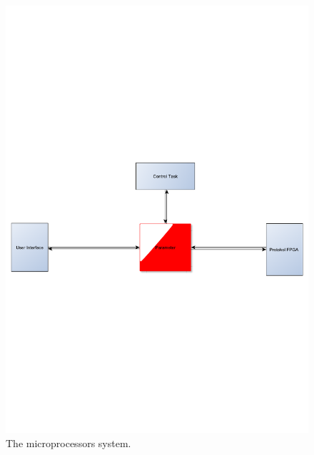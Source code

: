 \begin{figure}[htb]
	\centering
	\includegraphics[scale=0.5,clip,trim=0 300 0 300]{graphics/microprocessor} %
	\caption{The microprocessors system.}
	\label{fig:microprocessor}			%
\end{figure}



